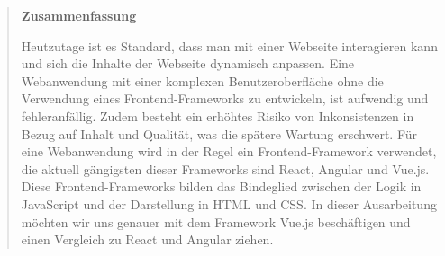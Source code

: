 \documentclass[%
	BCOR=8.25mm,         %
	DIV=12,              %
	parskip=half,				 %
	bibliography=totoc,	 %
	headsepline=on,      %
	]{scrbook}
\begin{document}
\pagestyle{empty}
\begin{quote}
	\vspace*{4cm}

	\begin{center}
		\textbf{\Large\sffamily Zusammenfassung}
	\end{center}
	Heutzutage ist es Standard, dass man mit einer Webseite interagieren kann und sich die Inhalte der Webseite dynamisch anpassen.
	Eine Webanwendung mit einer komplexen Benutzeroberfläche ohne die Verwendung eines Frontend-Frameworks zu entwickeln, ist aufwendig und fehleranfällig.
	Zudem besteht ein erhöhtes Risiko von Inkonsistenzen in Bezug auf Inhalt und Qualität, was die spätere Wartung erschwert.
	Für eine Webanwendung wird in der Regel ein Frontend-Framework verwendet, die aktuell gängigsten dieser Frameworks sind React, Angular und Vue.js.
	Diese Frontend-Frameworks bilden das Bindeglied zwischen der Logik in JavaScript und der Darstellung in HTML und CSS.
	In dieser Ausarbeitung möchten wir uns genauer mit dem Framework Vue.js beschäftigen und einen Vergleich zu React und Angular ziehen.

	
\end{quote}
\cleardoubleemptypage

\tableofcontents

\listoffigures
\listoftables
\lstlistoflistings

\mainmatter 
\pagestyle{headings}



%
%
%

\backmatter 

\appendix
%

\end{document}
